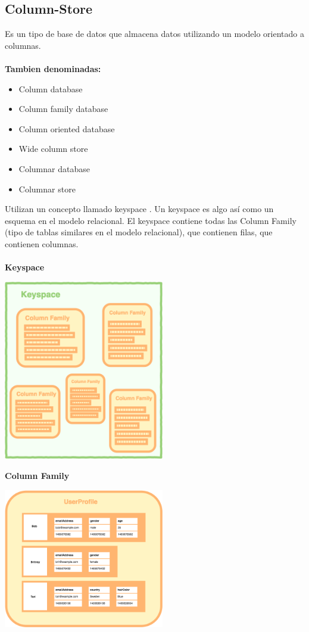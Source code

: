 \documentclass[twoside,twocolumn]{article}
\begin{document}
\subsection{Column-Store}
Es un tipo de base de datos que almacena datos utilizando un modelo orientado a columnas.
\\
\\
	\textbf{Tambien denominadas:}
\begin{itemize}	

	\item Column database
	\item Column family database
	\item Column oriented database
	\item Wide column store
	\item Columnar database
	\item Columnar store
\end{itemize} 
Utilizan un concepto llamado  keyspace . Un keyspace es algo así como un  esquema en el modelo relacional. El keyspace contiene todas las Column Family (tipo de tablas similares  en el modelo relacional), que contienen filas, que contienen columnas.
\\
\\
\textbf{Keyspace}
\begin{center}
	\includegraphics[width=7cm]{./Imagenes/keyspace} 
\end{center}

\textbf{Column Family}
\begin{center}
	\includegraphics[width=7cm]{./Imagenes/columfamily} 
\end{center}
\end{document}
